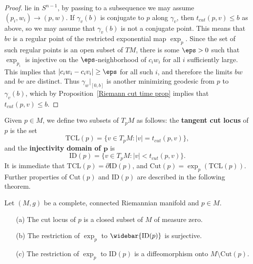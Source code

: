 \begin{proof}
lie in $S^{n-1}$, by passing to a subsequence we may assume $(p_i,w_i)\to(p,w)$. If $\gamma_v(b)$ is conjugate to $p$ along $\gamma_v$, then $t_{cut}(p,v)\leq b$ as above, 
so we may assume that $\gamma_v(b)$ is not a conjugate point. This means that $bv$ is a regular point of the restricted exponential map $\exp_p$. Since the set of such 
regular points is an open subset of $TM$, there is some $\eps>0$ such that $\exp_{p_i}$ is injective on the $\eps$-neighborhood of $c_iw_i$ for all $i$ sufficiently 
large. This implies that $|c_iw_i-c_iv_i|\geq\eps$ for all such $i$, and therefore the limits $bw$ and $bv$ are distinct. Thus $\gamma_w|_{[0,b]}$ is another minimizing 
geodesic from $p$ to $\gamma_v(b)$, which by Proposition~\ref{Riemann cut time prop} implies that $t_{cut}(p,v)\leq b$.
\end{proof}
Given $p\in M$, we define two subsets of $T_pM$ as follows: the \textbf{tangent cut locus} of $p$ is the set
\[\mathrm{TCL}(p)=\{v\in T_pM:|v|=t_{cut}(p,v)\},\]
and the \textbf{injectivity domain of $\bm{p}$} is
\[\mathrm{ID}(p)=\{v\in T_pM:|v|<t_{cut}(p,v)\}.\]
It is immediate that $\mathrm{TCL}(p)=\partial\mathrm{ID}(p)$, and $\mathrm{Cut}(p)=\exp_p(\mathrm{TCL}(p))$. Further properties of $\mathrm{Cut}(p)$ and $\mathrm{ID}(p)$ 
are described in the following theorem.
\begin{theorem}\label{Riemann TCL ID prop}
Let $(M,g)$ be a complete, connected Riemannian manifold and $p\in M$.
\begin{itemize}
\item[(a)] The cut locus of $p$ is a closed subset of $M$ of measure zero.
\item[(b)] The restriction of $\exp_p$ to $\widebar{\mathrm{ID}(p)}$ is surjective.
\item[(c)] The restriction of $\exp_p$ to $\mathrm{ID}(p)$ is a diffeomorphism onto $M\setminus\mathrm{Cut}(p)$.
\end{itemize}
\end{theorem}
